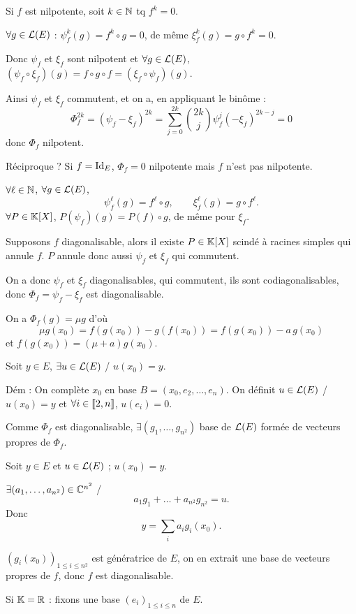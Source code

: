 \begin{solution}
Si $f$ est nilpotente, soit $k\in\mathbb N$ tq $f^k=0$.

$\forall g\in\mathcal L(E)$ : $\psi_f^k(g)=f^k\circ g=0$, de même
$\xi_f^k(g)=g\circ f^k=0$.

Donc $\psi_f$ et $\xi_f$ sont nilpotent et $\forall g\in\mathcal L(E)$,
$(\psi_f\circ\xi_f)(g)=f\circ g\circ f=(\xi_f\circ\psi_f)(g)$.

Ainsi $\psi_f$ et $\xi_f$ commutent, et on a, en appliquant le binôme :
\[
\Phi_f^{2k}=(\psi_f-\xi_f)^{2k}
=\sum_{j=0}^{2k}\binom{2k}{j}\psi_f^j(-\xi_f)^{2k-j}=0
\]
donc $\boxed{\Phi_f\text{ nilpotent}}$.

Réciproque ? Si $f=\operatorname{Id}_E$, $\Phi_f=0$ nilpotente mais $f$ n'est pas nilpotente.

$\forall \ell\in\mathbb N$, $\forall g\in\mathcal L(E)$,
\[
\psi_f^\ell(g)=f^\ell\circ g,\qquad \xi_f^\ell(g)=g\circ f^\ell.
\]
$\forall P\in\mathbb K[X]$, $P(\psi_f)(g)=P(f)\circ g$, de même pour $\xi_f$.

Supposons $f$ diagonalisable, alors il existe $P\in\mathbb K[X]$ scindé à racines
simples qui annule $f$. $P$ annule donc aussi $\psi_f$ et $\xi_f$ qui commutent.

On a donc $\psi_f$ et $\xi_f$ diagonalisables, qui commutent, ils sont
codiagonalisables, donc $\Phi_f=\psi_f-\xi_f$ est diagonalisable.

On a $\Phi_f(g)=\mu g$ d'où
\[
\mu g(x_0)=f(g(x_0))-g(f(x_0))
=f(g(x_0))-a\,g(x_0)
\]
et $f(g(x_0))=(\mu+a)g(x_0)$.

\begin{lemma*}
Soit $y\in E$, $\exists u\in\mathcal L(E)$ / $u(x_0)=y$.
\end{lemma*}
Dém : On complète $x_0$ en base $B=(x_0,e_2,\dots,e_n)$. On définit
$u\in\mathcal L(E)$ / $u(x_0)=y$ et $\forall i\in\llbracket 2,n\rrbracket$, $u(e_i)=0$.

Comme $\Phi_f$ est diagonalisable, $\exists(g_1,\dots,g_{n^2})$ base de
$\mathcal L(E)$ formée de vecteurs propres de $\Phi_f$.

Soit $y\in E$ et $u\in\mathcal L(E)$ ; $u(x_0)=y$.

$\exists(a_1,\dots,a_{n^2})\in\mathbb C^{n^2}$ /
\[
a_1g_1+\dots+a_{n^2}g_{n^2}=u.
\]
Donc
\[
y=\sum_i a_i g_i(x_0).
\]

$(g_i(x_0))_{1\leq i\leq n^2}$ est génératrice de $E$, on en extrait une base
de vecteurs propres de $f$, donc $f$ est diagonalisable.

Si $\mathbb K=\mathbb R$ : fixons une base $(e_i)_{1\leq i\leq n}$ de $E$.


\end{solution}
